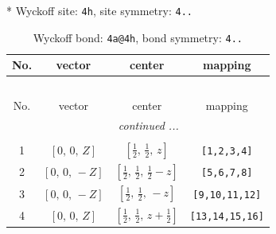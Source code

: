 \documentclass[fleqn,8pt]{jsarticle}
\begin{document}
* Wyckoff site: {\tt 4h}, site symmetry: {\tt 4..}
\renewcommand{\arraystretch}{1.2}
\begin{longtable}{cccc}
\caption{Wyckoff bond: {\tt 4a@4h}, bond symmetry: {\tt 4..}}
 \\
 \hline \hline
No. & vector & center & mapping \\ \hline \endfirsthead

\multicolumn{3}{l}{\tablename\ \thetable{}} \\
 \hline \hline
No. & vector & center & mapping \\ \hline \endhead

 \hline \hline
\multicolumn{3}{r}{\footnotesize\it continued ...} \\ \endfoot

 \hline \hline
\multicolumn{3}{r}{} \\ \endlastfoot

1 & $\left[ 0,\, 0,\, Z \right]$ & $\left[ \frac{1}{2},\, \frac{1}{2},\, z \right]$ & {\tt [1,2,3,4]} \\ \hline
2 & $\left[ 0,\, 0,\, - Z \right]$ & $\left[ \frac{1}{2},\, \frac{1}{2},\, \frac{1}{2} - z \right]$ & {\tt [5,6,7,8]} \\ \hline
3 & $\left[ 0,\, 0,\, - Z \right]$ & $\left[ \frac{1}{2},\, \frac{1}{2},\, - z \right]$ & {\tt [9,10,11,12]} \\ \hline
4 & $\left[ 0,\, 0,\, Z \right]$ & $\left[ \frac{1}{2},\, \frac{1}{2},\, z + \frac{1}{2} \right]$ & {\tt [13,14,15,16]} \\
\end{longtable}
\renewcommand{\arraystretch}{1.2}
\end{document}
